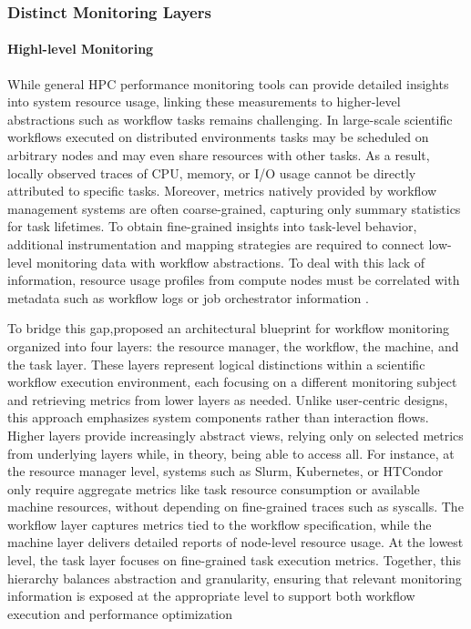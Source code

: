 \subsubsection{Distinct Monitoring Layers}
\label{sec:background_monitoring_layers}
\paragraph{Highl-level Monitoring}
While general HPC performance monitoring tools can provide detailed insights into system resource usage, linking these measurements to higher-level abstractions such as workflow tasks remains challenging. In large-scale scientific workflows executed on distributed environments tasks may be scheduled on arbitrary nodes and may even share resources with other tasks. As a result, locally observed traces of CPU, memory, or I/O usage cannot be directly attributed to specific tasks.  Moreover, metrics natively provided by workflow management systems are often coarse-grained, capturing only summary statistics for task lifetimes. To obtain fine-grained insights into task-level behavior, additional instrumentation and mapping strategies are required to connect low-level monitoring data with workflow abstractions. To deal with this lack of information, resource usage profiles from compute nodes must be correlated with metadata such as workflow logs or job orchestrator information \cite{Witzke2024}.

To bridge this gap,proposed an architectural blueprint for workflow monitoring organized into four layers: the resource manager, the workflow, the machine, and the task layer. These layers represent logical distinctions within a scientific workflow execution environment, each focusing on a different monitoring subject and retrieving metrics from lower layers as needed. Unlike user-centric designs, this approach emphasizes system components rather than interaction flows. Higher layers provide increasingly abstract views, relying only on selected metrics from underlying layers while, in theory, being able to access all. For instance, at the resource manager level, systems such as Slurm, Kubernetes, or HTCondor only require aggregate metrics like task resource consumption or available machine resources, without depending on fine-grained traces such as syscalls. The workflow layer captures metrics tied to the workflow specification, while the machine layer delivers detailed reports of node-level resource usage. At the lowest level, the task layer focuses on fine-grained task execution metrics. Together, this hierarchy balances abstraction and granularity, ensuring that relevant monitoring information is exposed at the appropriate level to support both workflow execution and performance optimization %

